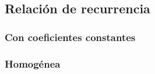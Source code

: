 \subsection{Relación de recurrencia}

\subsubsection{Con coeficientes constantes}

\subsubsection{Homogénea}